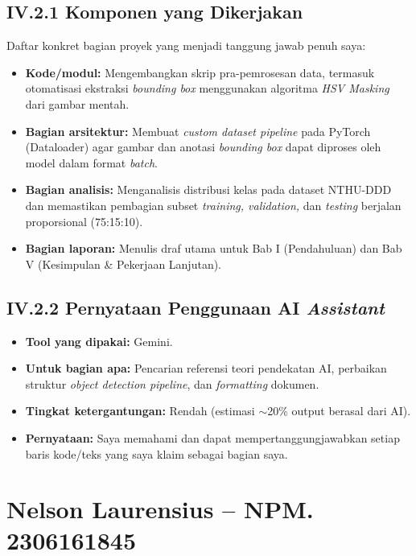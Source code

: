 \documentclass[11pt,a4paper,oneside]{report}
\begin{document}
\subsection*{IV.2.1 Komponen yang Dikerjakan}
Daftar konkret bagian proyek yang menjadi tanggung jawab penuh saya:
\begin{itemize}[leftmargin=*]
    \item \textbf{Kode/modul:} Mengembangkan skrip pra-pemrosesan data, termasuk otomatisasi ekstraksi \textit{bounding box} menggunakan algoritma \textit{HSV Masking} dari gambar mentah.
    \item \textbf{Bagian arsitektur:} Membuat \textit{custom dataset pipeline} pada PyTorch (Dataloader) agar gambar dan anotasi \textit{bounding box} dapat diproses oleh model dalam format \textit{batch}.
    \item \textbf{Bagian analisis:} Menganalisis distribusi kelas pada dataset NTHU-DDD dan memastikan pembagian subset \textit{training, validation,} dan \textit{testing} berjalan proporsional (75:15:10).
    \item \textbf{Bagian laporan:} Menulis draf utama untuk Bab I (Pendahuluan) dan Bab V (Kesimpulan \& Pekerjaan Lanjutan).
\end{itemize}

\subsection*{IV.2.2 Pernyataan Penggunaan AI \textit{Assistant}}
\begin{itemize}[leftmargin=*]
    \item \textbf{Tool yang dipakai:} Gemini.
    \item \textbf{Untuk bagian apa:} Pencarian referensi teori pendekatan AI, perbaikan struktur \textit{object detection pipeline}, dan \textit{formatting} dokumen.
    \item \textbf{Tingkat ketergantungan:} Rendah (estimasi $\sim$20\% output berasal dari AI).
    \item \textbf{Pernyataan:} Saya memahami dan dapat mempertanggungjawabkan setiap baris kode/teks yang saya klaim sebagai bagian saya.
\end{itemize}

\section{Nelson Laurensius -- NPM. 2306161845}
\end{document}
